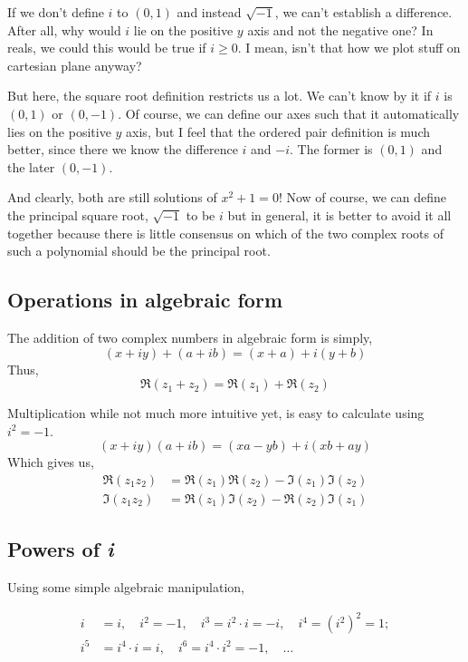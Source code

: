 If we don't define \(i\) to \((0,1)\) and instead \(\sqrt{-1}\), we can't
establish a difference. After all, why would \(i\) lie on the positive \(y\) axis
and not the negative one? In reals, we could this would be true if \(i \ge 0\). 
I mean, isn't that how we plot stuff on cartesian plane anyway? 

But here, the square root definition restricts us a lot. We can't know by it if
\(i\) is \((0,1)\) or \((0,-1)\). Of course, we can define our axes such that it
automatically lies on the positive \(y\) axis, but I feel that the ordered pair
definition is much better, since there we know the difference \(i\) and \(-i\). 
The former is \((0, 1)\) and the later \((0, -1)\). 

And clearly, both are still solutions of \(x^2 + 1 = 0\)! Now of course,
we can define the principal square root, \(\sqrt{-1}\) to be \(i\) but in general,
it is better to avoid it all together because there is little consensus on which of the
two complex roots of such a polynomial should be the principal root.

\subsection{Operations in algebraic form}

The addition of two complex numbers in algebraic form is simply,
\[(x + iy) + (a + ib) = (x+a) + i(y+b)\] Thus, 
\[\Re(z_1 + z_2) = \Re(z_1) + \Re(z_2)\]

Multiplication while not much more intuitive yet, is easy to calculate using \(i^2 = -1\).
\[(x+iy)(a+ib) = (xa - yb) + i(xb + ay)\] Which gives us,
\begin{align*}
    \Re(z_1z_2) &= \Re(z_1)\Re(z_2) - \Im(z_1)\Im(z_2) \\
    \Im(z_1z_2) &= \Re(z_1)\Im(z_2) - \Re(z_2)\Im(z_1)
\end{align*}

\subsection{Powers of \emph{i}}

Using some simple algebraic manipulation,

\begin{align*}
    i &= i, \quad i^2 = -1, \quad i^3 = i^2 \cdot i = -i, \quad i^4 = (i^2)^2 = 1; \\
    i^5 &= i^4 \cdot i = i, \quad i^6 = i^4 \cdot i^2 = -1, \quad \dots  
\end{align*}

